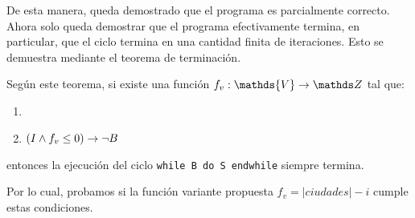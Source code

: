 \documentclass[10pt,a4paper]{article}
\begin{document}
De esta manera, queda demostrado que el programa es parcialmente correcto. Ahora solo queda demostrar que el programa efectivamente termina, en particular, que el ciclo termina en una cantidad finita de iteraciones. Esto se demuestra mediante el teorema de terminación.
\bigskip

Según este teorema, si existe una función $f_v: \mathds{V} \to \ent$ tal que:

\begin{enumerate}
	\item {}
	\item $(I \land f_v \leq 0) \rightarrow \neg B$
\end{enumerate}

entonces la ejecución del ciclo \lstinline|while B do S endwhile| siempre termina.
\bigskip

Por lo cual, probamos si la función variante propuesta $f_v = |ciudades| - i$ cumple estas condiciones.
\bigskip
\end{document}
